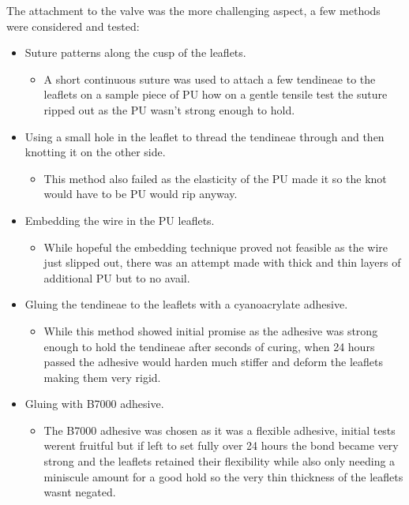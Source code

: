 The attachment to the valve was the more challenging aspect, a few methods were considered and tested:
\begin{itemize}
    \item Suture patterns along the cusp of the leaflets.
          \begin{itemize}
              \item A short continuous suture was used to attach a few tendineae to the leaflets on a sample piece of \gls{PU} how on a gentle tensile test the suture ripped out as the \gls{PU} wasn't strong enough to hold.
          \end{itemize}
    \item Using a small hole in the leaflet to thread the tendineae through and then knotting it on the other side.
          \begin{itemize}
              \item This method also failed as the elasticity of the \gls{PU} made it so the knot would have to be \gls{PU} would rip anyway.
          \end{itemize}
    \item Embedding the wire in the \gls{PU} leaflets.
          \begin{itemize}
              \item While hopeful the embedding technique proved not feasible as the wire just slipped out, there was an attempt made with thick and thin layers of additional \gls{PU} but to no avail.
          \end{itemize}
    \item Gluing the tendineae to the leaflets with a cyanoacrylate adhesive.
          \begin{itemize}
              \item While this method showed initial promise as the adhesive was strong enough to hold the tendineae after seconds of curing, when 24 hours passed the adhesive would harden much stiffer and deform the leaflets making them very rigid.
          \end{itemize}
    \item Gluing with B7000 adhesive.
          \begin{itemize}
              \item The B7000 adhesive was chosen as it was a flexible adhesive, initial tests werent fruitful but if left to set fully over 24 hours the bond became very strong and the leaflets retained their flexibility while also only needing a miniscule amount for a good hold so the very thin thickness of the leaflets wasnt negated.
          \end{itemize}
\end{itemize}
